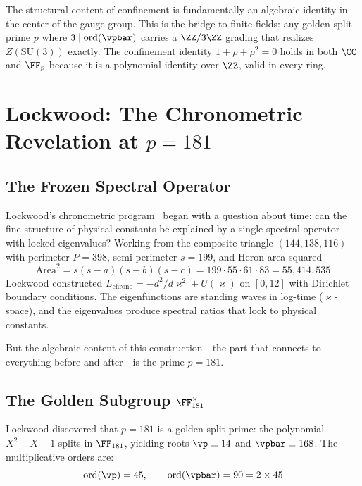 The structural content of confinement is fundamentally an algebraic identity in the center of the gauge group. This is the bridge to finite fields: any golden split prime $p$ where $3 \mid \mathrm{ord}(\vpbar)$ carries a $\ZZ/3\ZZ$ grading that realizes $Z(\mathrm{SU}(3))$ exactly. The confinement identity $1 + \rho + \rho^2 = 0$ holds in both $\CC$ and $\FF_p$ because it is a polynomial identity over $\ZZ$, valid in every ring.


\section{Lockwood: The Chronometric Revelation at $p = 181$}

\subsection{The Frozen Spectral Operator}

Lockwood's chronometric program~\cite{lockwood_chrono3,lockwood_chrono4} began with a question about time: can the fine structure of physical constants be explained by a single spectral operator with locked eigenvalues? Working from the composite triangle $(144, 138, 116)$ with perimeter $P = 398$, semi-perimeter $s = 199$, and Heron area-squared
\[
\mathrm{Area}^2 = s(s-a)(s-b)(s-c) = 199 \cdot 55 \cdot 61 \cdot 83 = 55{,}414{,}535
\]
Lockwood constructed $L_{\mathrm{chrono}} = -d^2/d\varkappa^2 + U(\varkappa)$ on $[0, 12]$ with Dirichlet boundary conditions. The eigenfunctions are standing waves in log-time ($\varkappa$-space), and the eigenvalues produce spectral ratios that lock to physical constants.

But the algebraic content of this construction---the part that connects to everything before and after---is the prime $p = 181$.

\subsection{The Golden Subgroup $\FF_{181}^\times$}

Lockwood discovered that $p = 181$ is a golden split prime: the polynomial $X^2 - X - 1$ splits in $\FF_{181}$, yielding roots $\vp \equiv 14$ and $\vpbar \equiv 168$. The multiplicative orders are:
\begin{equation}\label{eq:lockwood_orders}
\mathrm{ord}(\vp) = 45, \qquad \mathrm{ord}(\vpbar) = 90 = 2 \times 45
\end{equation}

